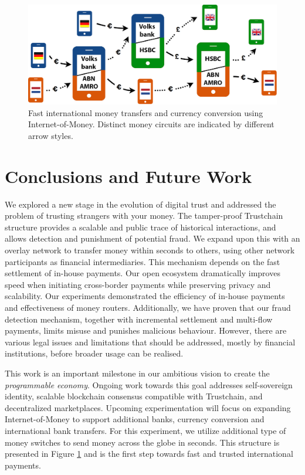 
\begin{figure}[h]
	\centering
	\includegraphics[width=1\textwidth]{iom/assets/internet_of_money_network.png}
	\caption{Fast international money transfers and currency conversion using Internet-of-Money. Distinct money circuits are indicated by different arrow styles.}
	\label{fig:internet_of_money_network}
\end{figure}

\section{Conclusions and Future Work}
We explored a new stage in the evolution of digital trust and addressed the problem of trusting strangers with your money.
The tamper-proof Trustchain structure provides a scalable and public trace of historical interactions, and allows detection and punishment of potential fraud.
We expand upon this with an overlay network to transfer money within seconds to others, using other network participants as financial intermediaries.
This mechanism depends on the fast settlement of in-house payments.
Our open ecosystem dramatically improves speed when initiating cross-border payments while preserving privacy and scalability.
Our experiments demonstrated the efficiency of in-house payments and effectiveness of money routers.
Additionally, we have proven that our fraud detection mechanism, together with incremental settlement and multi-flow payments, limits misuse and punishes malicious behaviour.
However, there are various legal issues and limitations that should be addressed, mostly by financial institutions, before broader usage can be realised.

This work is an important milestone in our ambitious vision to create the \emph{programmable economy}.
Ongoing work towards this goal addresses self-sovereign identity, scalable blockchain consensus compatible with Trustchain, and decentralized marketplaces.
Upcoming experimentation will focus on expanding Internet-of-Money to support additional banks, currency conversion and international bank transfers.
For this experiment, we utilize additional type of money switches to send money across the globe in seconds.
This structure is presented in Figure \ref{fig:internet_of_money_network} and is the first step towards fast and trusted international payments.